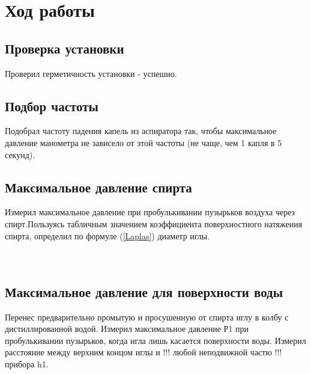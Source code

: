 
\section{Ход работы}

\subsection{Проверка установки}
Проверил герметичность установки - успешно.

\subsection{Подбор частоты}
Подобрал частоту падения капель из аспиратора так, чтобы максимальное давление манометра не зависело от этой частоты (не чаще, чем 1 капля в 5 секунд).

\subsection{Максимальное давление спирта}

Измерил максимальное давление   при  пробулькивании пузырьков воздуха через спирт.Пользуясь табличным значением коэффициента поверхностного натяжения спирта, определил по формуле (\ref{Laplas}) диаметр иглы. \\[0.2cm]

\noindent{} \\

\noindent{} \\

\noindent{}

\subsection{Максимальное давление для поверхности воды}

Перенес предварительно промытую и просушенную от спирта иглу в колбу с дистиллированной водой. Измерил максимальное давление Р1 при пробулькивании пузырьков, когда игла лишь касается поверхности воды. Измерил расстояние между верхним концом иглы и !!! любой неподвижной частю !!! прибора h1. \\[0.2cm]

\noindent{} \\

\noindent{}

